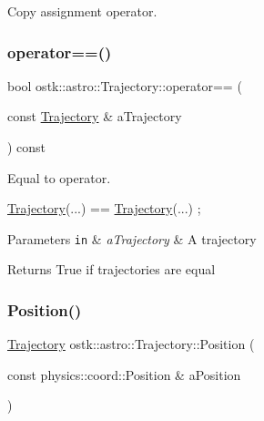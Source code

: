 Copy assignment operator. 

\mbox{\label{classostk_1_1astro_1_1_trajectory_a13b1a0621195ed85aa3df0da5ae935f2}} 
\subsubsection{\texorpdfstring{operator==()}{operator==()}}
{\footnotesize\ttfamily bool ostk\+::astro\+::\+Trajectory\+::operator== (\begin{DoxyParamCaption}\item[{const \hyperlink{classostk_1_1astro_1_1_trajectory}{Trajectory} \&}]{a\+Trajectory }\end{DoxyParamCaption}) const}



Equal to operator. 


\begin{DoxyCode}
\hyperlink{classostk_1_1astro_1_1_trajectory_a9333200bd6afed5aef4f5aad8a2a8e84}{Trajectory}(...) == \hyperlink{classostk_1_1astro_1_1_trajectory_a9333200bd6afed5aef4f5aad8a2a8e84}{Trajectory}(...) ;
\end{DoxyCode}



\begin{DoxyParams}[1]{Parameters}
\mbox{\tt in}  & {\em a\+Trajectory} & A trajectory \\
\hline
\end{DoxyParams}
\begin{DoxyReturn}{Returns}
True if trajectories are equal 
\end{DoxyReturn}
\mbox{\label{classostk_1_1astro_1_1_trajectory_ae98d1466450030f73a83567c8cc1471a}} 
\subsubsection{\texorpdfstring{Position()}{Position()}}
{\footnotesize\ttfamily \hyperlink{classostk_1_1astro_1_1_trajectory}{Trajectory} ostk\+::astro\+::\+Trajectory\+::\+Position (\begin{DoxyParamCaption}\item[{const physics\+::coord\+::\+Position \&}]{a\+Position }\end{DoxyParamCaption})\hspace{0.3cm}{\ttfamily [static]}}



